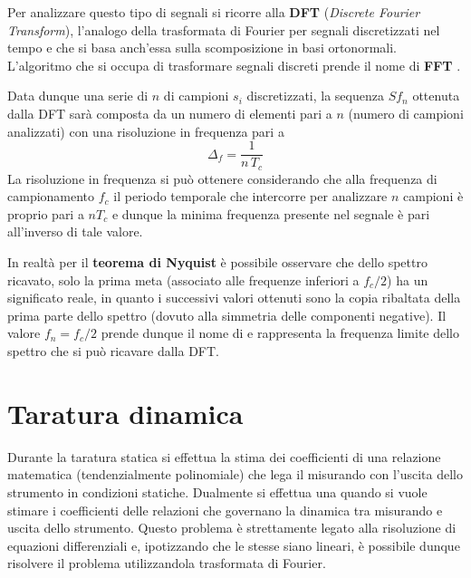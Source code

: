 		Per analizzare questo tipo di segnali si ricorre alla  \textbf{DFT} (\textit{Discrete Fourier Transform}), l'analogo della trasformata di Fourier per segnali discretizzati nel tempo e che si basa anch'essa sulla scomposizione in basi ortonormali. L'algoritmo  che si occupa di trasformare segnali discreti prende il nome di \textbf{FFT} .
		
		Data dunque una serie di $n$ di campioni $s_i$ discretizzati, la sequenza $Sf_n$ ottenuta dalla DFT sarà composta da un numero di elementi pari a $n$ (numero di campioni analizzati) con una risoluzione in frequenza pari a 
		\[ \Delta_f = \frac 1 {n\,T_c}\]
		La risoluzione in frequenza si può ottenere considerando che alla frequenza di campionamento $f_c$ il periodo temporale che intercorre per analizzare $n$ campioni è proprio pari a $n T_c$ e dunque la minima frequenza presente nel segnale è pari all'inverso di tale valore.
		
		In realtà per il \textbf{teorema di Nyquist} è possibile osservare che dello spettro ricavato, solo la prima meta (associato alle frequenze inferiori a $f_c/2$) ha un significato reale, in quanto i successivi valori ottenuti sono la copia ribaltata della prima parte dello spettro (dovuto alla simmetria delle componenti negative). Il valore $f_n = f_c/2$ prende dunque il nome di  e rappresenta la frequenza limite dello spettro che si può ricavare dalla DFT.
		
		
		
\section{Taratura dinamica}
		
		Durante la taratura statica si effettua la stima dei coefficienti di una relazione matematica (tendenzialmente polinomiale) che lega il misurando con l'uscita dello strumento in condizioni statiche. Dualmente si effettua una  quando si vuole stimare i coefficienti delle relazioni che governano la dinamica tra misurando e uscita dello strumento. Questo problema è strettamente legato alla risoluzione di equazioni differenziali e, ipotizzando che le stesse siano lineari, è possibile dunque risolvere il problema utilizzandola trasformata di Fourier.
		
